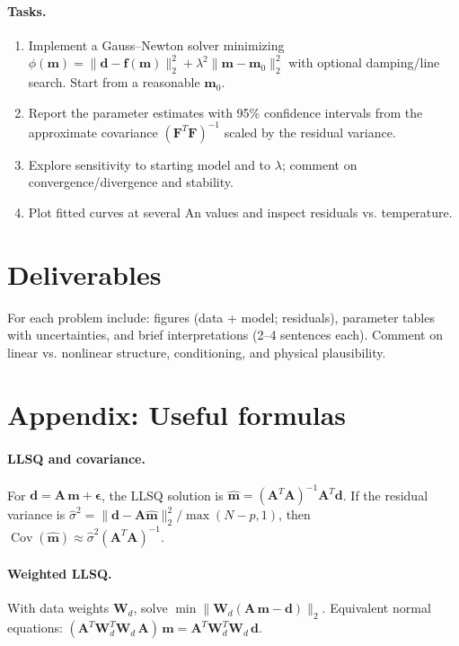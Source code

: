 \documentclass[11pt,a4paper]{article}
\begin{document}
\paragraph{Tasks.}
\begin{enumerate}
  \item Implement a Gauss--Newton solver minimizing $\phi(\mathbf m)=\lVert \mathbf d-\mathbf f(\mathbf m)\rVert_2^2 + \lambda^2\lVert\mathbf m-\mathbf m_0\rVert_2^2$ with optional damping/line search. Start from a reasonable $\mathbf m_0$.
  \item Report the parameter estimates with 95\% confidence intervals from the approximate covariance $(\mathbf F^T\mathbf F)^{-1}$ scaled by the residual variance.
  \item Explore sensitivity to starting model and to $\lambda$; comment on convergence/divergence and stability.
  \item Plot fitted curves at several An values and inspect residuals vs. temperature.
\end{enumerate}

\section*{Deliverables}
For each problem include: figures (data + model; residuals), parameter tables with uncertainties, and brief interpretations (2--4 sentences each). Comment on linear vs. nonlinear structure, conditioning, and physical plausibility.

\section*{Appendix: Useful formulas}
\paragraph{LLSQ and covariance.} For $\mathbf d=\mathbf A\,\mathbf m+\boldsymbol\epsilon$, the LLSQ solution is $\hat{\mathbf m}= (\mathbf A^T\mathbf A)^{-1}\mathbf A^T\mathbf d$. If the residual variance is $\hat\sigma^2=\lVert\mathbf d-\mathbf A\hat{\mathbf m}\rVert_2^2/\max(N-p,1)$, then $\operatorname{Cov}(\hat{\mathbf m})\approx \hat\sigma^2(\mathbf A^T\mathbf A)^{-1}$.

\paragraph{Weighted LLSQ.} With data weights $\mathbf W_d$, solve $\min\lVert \mathbf W_d(\mathbf A\,\mathbf m-\mathbf d)\rVert_2$. Equivalent normal equations: $(\mathbf A^T\mathbf W_d^T\mathbf W_d\,\mathbf A)\,\mathbf m=\mathbf A^T\mathbf W_d^T\mathbf W_d\,\mathbf d$.
\end{document}
